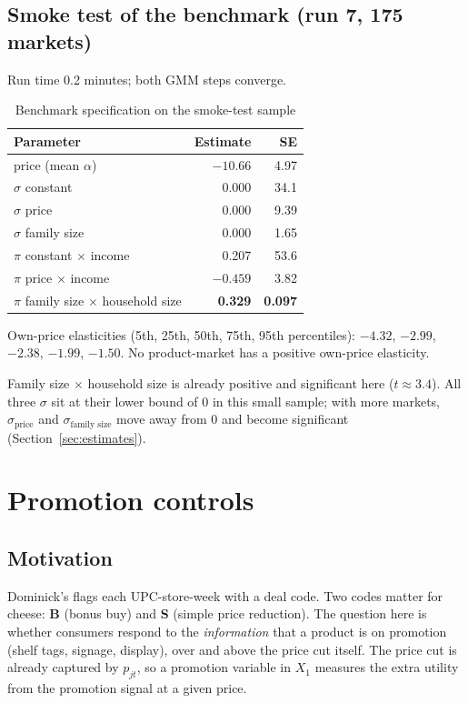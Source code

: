 \documentclass[11pt]{article}
\newcommand{\sigprice}{\sigma_{\text{price}}}
\begin{document}
\subsection{Smoke test of the benchmark (run 7, 175 markets)}\label{sec:smoke}

Run time 0.2 minutes; both GMM steps converge.

\begin{table}[htbp]
\centering
\small
\caption{Benchmark specification on the smoke-test sample}\label{tab:smoke}
\begin{tabular}{@{}lrr@{}}
\toprule
Parameter & Estimate & SE \\
\midrule
price (mean $\alpha$) & $-10.66$ & 4.97 \\
$\sigma$ constant & 0.000 & 34.1 \\
$\sigma$ price & 0.000 & 9.39 \\
$\sigma$ family size & 0.000 & 1.65 \\
$\pi$ constant $\times$ income & 0.207 & 53.6 \\
$\pi$ price $\times$ income & $-0.459$ & 3.82 \\
$\pi$ family size $\times$ household size & \textbf{0.329} & \textbf{0.097} \\
\bottomrule
\end{tabular}
\end{table}

Own-price elasticities (5th, 25th, 50th, 75th, 95th percentiles): $-4.32$, $-2.99$, $-2.38$,
$-1.99$, $-1.50$. No product-market has a positive own-price elasticity.

Family size $\times$ household size is already positive and significant here
($t \approx 3.4$). All three $\sigma$ sit at their lower bound of 0 in this small sample; with
more markets, $\sigprice$ and $\sigma_{\text{family size}}$ move away from 0 and become
significant (Section~\ref{sec:estimates}).

\section{Promotion controls}\label{sec:promo}

\subsection{Motivation}\label{sec:promo-motivation}

Dominick's flags each UPC-store-week with a deal code. Two codes matter for cheese:
\textbf{B} (bonus buy) and \textbf{S} (simple price reduction). The question here is whether
consumers respond to the \emph{information} that a product is on promotion (shelf tags,
signage, display), over and above the price cut itself. The price cut is already captured by
$p_{jt}$, so a promotion variable in $X_1$ measures the extra utility from the promotion signal
at a given price.
\end{document}
